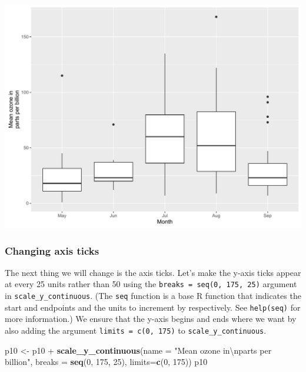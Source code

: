 \documentclass[]{article}
\newenvironment{Shaded}{\begin{snugshade}}{\end{snugshade}}
\newcommand{\KeywordTok}[1]{\textcolor[rgb]{0.13,0.29,0.53}{\textbf{{#1}}}}
\newcommand{\DataTypeTok}[1]{\textcolor[rgb]{0.13,0.29,0.53}{{#1}}}
\newcommand{\DecValTok}[1]{\textcolor[rgb]{0.00,0.00,0.81}{{#1}}}
\newcommand{\CharTok}[1]{\textcolor[rgb]{0.31,0.60,0.02}{{#1}}}
\newcommand{\StringTok}[1]{\textcolor[rgb]{0.31,0.60,0.02}{{#1}}}
\newcommand{\NormalTok}[1]{{#1}}
\begin{document}
\begin{center}\includegraphics{0_all_posts_pdf/box_3-1} \end{center}

\subsubsection{Changing axis ticks}\label{changing-axis-ticks-3}

The next thing we will change is the axis ticks. Let's make the y-axis
ticks appear at every 25 units rather than 50 using the
\texttt{breaks\ =\ seq(0,\ 175,\ 25)} argument in
\texttt{scale\_y\_continuous}. (The \texttt{seq} function is a base R
function that indicates the start and endpoints and the units to
increment by respectively. See \texttt{help(seq)} for more information.)
We ensure that the y-axis begins and ends where we want by also adding
the argument \texttt{limits\ =\ c(0,\ 175)} to
\texttt{scale\_y\_continuous}.

\begin{Shaded}
\begin{Highlighting}[]
\NormalTok{p10 <-}\StringTok{ }\NormalTok{p10 +}\StringTok{ }\KeywordTok{scale_y_continuous}\NormalTok{(}\DataTypeTok{name =} \StringTok{"Mean ozone in}\CharTok{\textbackslash{}n}\StringTok{parts per billion"}\NormalTok{,}
                              \DataTypeTok{breaks =} \KeywordTok{seq}\NormalTok{(}\DecValTok{0}\NormalTok{, }\DecValTok{175}\NormalTok{, }\DecValTok{25}\NormalTok{),}
                              \DataTypeTok{limits=}\KeywordTok{c}\NormalTok{(}\DecValTok{0}\NormalTok{, }\DecValTok{175}\NormalTok{))}
\NormalTok{p10}
\end{Highlighting}
\end{Shaded}
\end{document}
